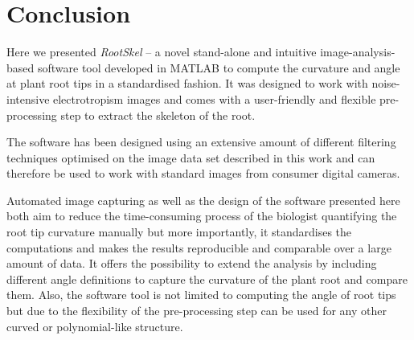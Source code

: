 
\chapter{Conclusion} %

\label{conclusion} %

%







Here we presented \textit{RootSkel} -- a novel stand-alone and intuitive image-analysis-based software tool developed in MATLAB to compute the curvature and angle at plant root tips in a standardised fashion. It was designed to work with noise-intensive electrotropism images and comes with a user-friendly and flexible pre-processing step to extract the skeleton of the root. %

The software has been designed using an extensive amount of different filtering techniques optimised on the image data set described in this work and can therefore be used to work with standard images from consumer digital cameras. 

Automated image capturing as well as the design of the software presented here both aim to reduce the time-consuming process of the biologist quantifying the root tip curvature manually but more importantly, it standardises the computations and makes the results reproducible and comparable over a large amount of data. It offers the possibility to extend the analysis by including different angle definitions to capture the curvature of the plant root and compare them. Also, the software tool is not limited to computing the angle of root tips but due to the flexibility of the pre-processing step can be used for any other curved or polynomial-like structure. 

